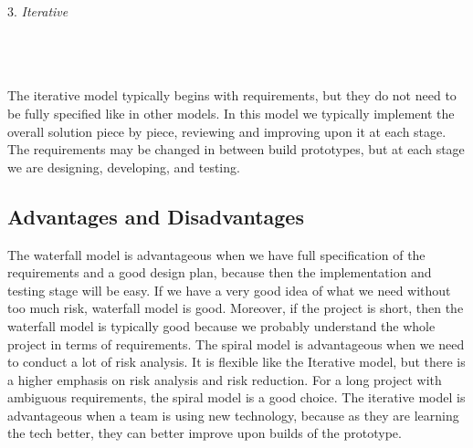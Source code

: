 \documentclass{article}
\begin{document}
3. \textit{Iterative} \\ \\
 \\ \\
The iterative model typically begins with requirements, but they do not need to be fully specified like in other models.  In this model we typically implement the overall solution piece by piece, reviewing and improving upon it at each stage.  The requirements may be changed in between build prototypes, but at each stage we are designing, developing, and testing.

\subsection{Advantages and Disadvantages}
The waterfall model is advantageous when we have full specification of the requirements and a good design plan, because then the implementation and testing stage will be easy.  If we have a very good idea of what we need without too much risk, waterfall model is good.  Moreover, if the project is short, then the waterfall model is typically good because we probably understand the whole project in terms of requirements. The spiral model is advantageous when we need to conduct a lot of risk analysis.  It is flexible like the Iterative model, but there is a higher emphasis on risk analysis and risk reduction.  For a long project with ambiguous requirements, the spiral model is a good choice.  The iterative model is advantageous when a team is using new technology, because as they are learning the tech better, they can better improve upon builds of the prototype.
\end{document}
